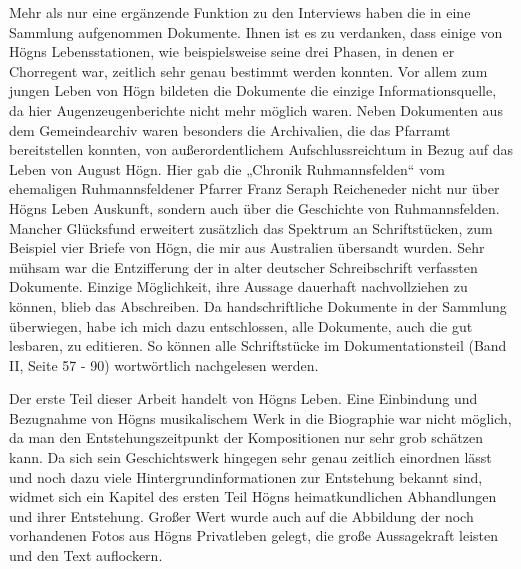 Mehr als nur eine ergänzende Funktion zu den Interviews haben die in
eine Sammlung aufgenommen Dokumente. Ihnen ist es zu verdanken, dass
einige von Högns Lebensstationen, wie beispielsweise seine drei Phasen,
in denen er Chorregent war, zeitlich sehr genau bestimmt werden
konnten. Vor allem zum jungen Leben von Högn bildeten die Dokumente die
einzige Informationsquelle, da hier Augenzeugenberichte nicht mehr
möglich waren. Neben Dokumenten aus dem Gemeindearchiv waren besonders
die Archivalien, die das Pfarramt bereitstellen konnten, von
außerordentlichem Aufschlussreichtum in Bezug auf das Leben von August
Högn. Hier gab die „Chronik Ruhmannsfelden“ vom ehemaligen
Ruhmannsfeldener Pfarrer Franz Seraph Reicheneder nicht nur über Högns
Leben Auskunft, sondern auch über die Geschichte von Ruhmannsfelden.
Mancher Glücksfund erweitert zusätzlich das Spektrum an Schriftstücken,
zum Beispiel vier Briefe von Högn, die mir aus Australien übersandt
wurden. Sehr mühsam war die Entzifferung der in alter deutscher
Schreibschrift verfassten Dokumente. Einzige Möglichkeit, ihre Aussage
dauerhaft nachvollziehen zu können, blieb das Abschreiben. Da
handschriftliche Dokumente in der Sammlung überwiegen, habe ich mich
dazu entschlossen, alle Dokumente, auch die gut lesbaren, zu editieren.
So können alle Schriftstücke im Dokumentationsteil (Band II, Seite 57 -
90) wortwörtlich nachgelesen werden.

Der erste Teil dieser Arbeit handelt von Högns Leben. Eine Einbindung
und Bezugnahme von Högns musikalischem Werk in die Biographie war nicht
möglich, da man den Entstehungszeitpunkt der Kompositionen nur sehr
grob schätzen kann. Da sich sein Geschichtswerk hingegen sehr genau
zeitlich einordnen lässt und noch dazu viele Hintergrundinformationen
zur Entstehung bekannt sind, widmet sich ein Kapitel des ersten Teil
Högns heimatkundlichen Abhandlungen und ihrer Entstehung. Großer Wert
wurde auch auf die Abbildung der noch vorhandenen Fotos aus Högns
Privatleben gelegt, die große Aussagekraft leisten und den Text
auflockern.

